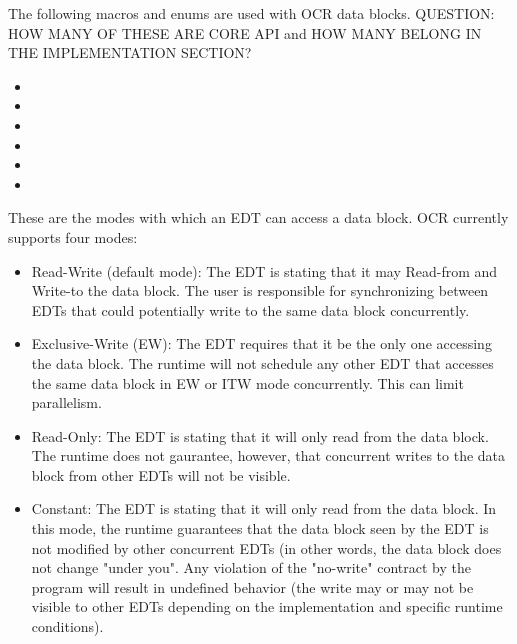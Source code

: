 The following macros and enums  are used with OCR data blocks.  QUESTION: HOW MANY OF THESE
ARE CORE API and HOW MANY BELONG IN THE IMPLEMENTATION SECTION?
\begin{itemize}
\item {}
\item {}
\item {}
\item {}
\item {}
\item {}
\end{itemize}


These are the modes with which an EDT can access a data block. OCR currently supports four
modes:
\begin{itemize}
\item {}  Read-Write (default mode): The EDT is stating that it may Read-from and Write-to the 
data block.   The user is responsible for synchronizing between EDTs that could potentially write to
the same data block concurrently. 
\item {}  Exclusive-Write (EW): The EDT requires that it be the only one accessing the data block. The
runtime will not schedule any other EDT that accesses the same data block in EW or ITW mode
concurrently. This can limit parallelism. 
\item {}   Read-Only: The EDT is stating that it will only read from the data block. 
The runtime does not gaurantee, however, that concurrent writes to the data block from other
EDTs will not be visible. 
\item {}  Constant: The EDT is stating that it will only read from the data block. In this mode, the
runtime guarantees that the data block seen by the EDT is not modified by other concurrent
EDTs (in other words, the data block does not change "under you". Any violation of the
"no-write" contract by the program will result in undefined behavior (the write may or may not
be visible to other EDTs depending on the implementation and specific runtime conditions). \\
\end{itemize}
 
